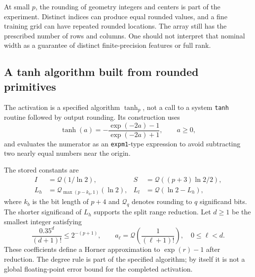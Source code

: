 \documentclass[11pt]{article}
\newcommand{\Q}{\mathcal Q}
\newcommand{\tp}{\operatorname{tanh}_{p}}
\newcommand{\code}[1]{\texttt{#1}}
\begin{document}
At small $p$, the rounding of geometry integers and centers is part of the
experiment. Distinct indices can produce equal rounded values, and a fine
training grid can have repeated rounded locations. The array still has the
prescribed number of rows and columns. One should not interpret that nominal
width as a guarantee of distinct finite-precision features or full rank.

\subsection{A tanh algorithm built from rounded primitives}
The activation is a specified algorithm $\tp$, not a call to a system
\code{tanh} routine followed by output rounding. Its construction uses
\[
 \tanh(a)=-\frac{\exp(-2a)-1}{\exp(-2a)+1},\qquad a\ge0,
\]
and evaluates the numerator as an \code{expm1}-type expression to avoid
subtracting two nearly equal numbers near the origin.

The stored constants are
\begin{align*}
 I&=\Q(1/\ln2), & S&=\Q((p+3)\ln2/2),\\
 L_h&=\Q_{\max(p-k_b,1)}(\ln2), &
 L_l&=\Q(\ln2-L_h),
\end{align*}
where $k_b$ is the bit length of $p+4$ and $\Q_q$ denotes rounding to $q$
significand bits. The shorter significand of $L_h$ supports the split range
reduction. Let $d\ge1$ be the smallest integer satisfying
\[
 \frac{0.35^d}{(d+1)!}\le2^{-(p+1)},\qquad
 a_\ell=\Q\!\left(\frac1{(\ell+1)!}\right),\quad 0\le\ell<d.
\]
These coefficients define a Horner approximation to $\exp(r)-1$ after
reduction. The degree rule is part of the specified algorithm; by itself it
is not a global floating-point error bound for the completed activation.
\end{document}
